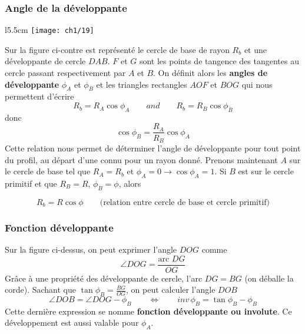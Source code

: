 \subsubsection{Angle de la développante}
	\begin{wrapfigure}[12]{l}{5.5cm}
	\vspace{-5mm}
	\texttt{[image: ch1/19]}
	\end{wrapfigure}
	Sur la figure ci-contre est représenté le cercle de base de rayon $R_b$ et une développante de cercle $DAB$. $F$ et $G$ sont les points de tangence des tangentes au cercle passant respectivement par $A$ et $B$. On définit alors les \textbf{angles de développante} $\phi _A$ et $\phi _B$ et les triangles rectangles $AOF$ et $BOG$ qui nous permettent d'écrire
	\begin{equation}
		R_b = R_A \cos \phi _A \qquad and \qquad R_b = R_B \cos \phi _B
	\end{equation}
	donc 
	\begin{equation}
		\cos \phi _B = \frac{R_A}{R_B} \cos \phi _A
	\end{equation}
	Cette relation nous permet de déterminer l'angle de développante pour tout point du profil, au départ d'une connu pour un rayon donné. Prenons maintenant $A$ sur le cercle de base tel que $R_A = R_b$ et $\phi _A = 0 \rightarrow \cos \phi _A = 1$. Si $B$ est sur le cercle primitif et que $R_B = R$, $\phi _B = \phi$, alors 
	
	\begin{equation}
	R_b = R \cos \phi \qquad \mbox{(relation entre cercle de base et cercle primitif)}
	\end{equation}	 
	
\subsubsection{Fonction développante}
	Sur la figure ci-dessus, on peut exprimer l'angle $DOG$ comme
	\begin{equation}
		\angle DOG = \frac{\mbox{arc } DG}{OG}
	\end{equation}
	Grâce à une propriété des développante de cercle, l'arc $DG = BG$ (on déballe la corde). Sachant que $\tan \phi _B = \frac{BG}{OG}$, on peut calculer l'angle $DOB$ 
	\begin{equation}
		\angle DOB = \angle DOG - \phi _B \qquad \Leftrightarrow \qquad inv \, \phi _B= \tan \phi _B - \phi _B
		\label{equation:1.7}
	\end{equation}
	Cette dernière expression se nomme \textbf{fonction développante ou involute}. Ce développement est aussi valable pour $\phi _A$.
	
